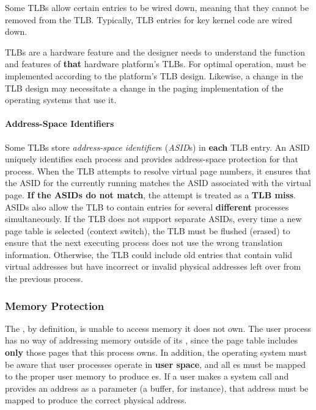 Some TLBs allow certain entries to be wired down, meaning that they cannot be removed from the TLB.\@
Typically, TLB entries for key kernel code are wired down.

TLBs are a hardware feature and the  designer needs to understand the function and features of \textbf{that} hardware platform's TLBs.
For optimal operation,  must be implemented according to the platform’s TLB design.
Likewise, a change in the TLB design may necessitate a change in the paging implementation of the operating systems that use it.

\paragraph{Address-Space Identifiers}\label{par:Address_Space_Identifiers}
Some TLBs store \emph{address-space identifier}s (\emph{ASID}s) in \textbf{each} TLB entry.
An ASID uniquely identifies each process and provides address-space protection for that process.
When the TLB attempts to resolve virtual page numbers, it ensures that the ASID for the currently running  matches the ASID associated with the virtual page.
\textbf{If the ASIDs do not match}, the attempt is treated as a \textbf{TLB miss}.
ASIDs also allow the TLB to contain entries for several \textbf{different} processes simultaneously.
If the TLB does not support separate ASIDs, every time a new page table is selected (context switch), the TLB must be flushed (erased) to ensure that the next executing process does not use the wrong translation information.
Otherwise, the TLB could include old entries that contain valid virtual addresses but have incorrect or invalid physical addresses left over from the previous process.

\subsubsection{Memory Protection}\label{subsubsec:Paging_Memory_Protection}
The  , by definition, is unable to access memory it does not own.
The user process has no way of addressing memory outside of its , since the page table includes \textbf{only} those pages that this process owns.
In addition, the operating system must be aware that user processes operate in \textbf{user space}, and all es must be mapped to the proper user memory to produce es.
If a user makes a system call and provides an address as a parameter (a buffer, for instance), that address must be mapped to produce the correct physical address.

